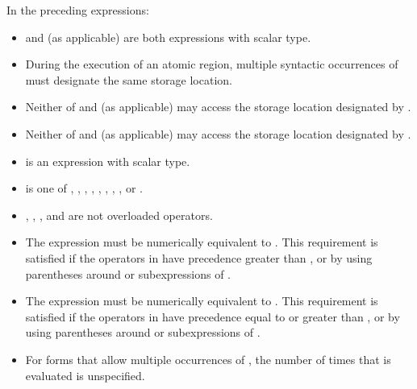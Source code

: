 \begin{ccppspecific}
In the preceding expressions:

\begin{itemize}
\item {} and  (as applicable) are both  expressions with scalar type.

\item During the execution of an atomic region, multiple syntactic occurrences of  must 
designate the same storage location.

\item Neither of  and  (as applicable) may access the storage location designated by .

\item Neither of  and  (as applicable) may access the storage location designated by .

\item {} is an expression with scalar type. 

\item {} is one of \code{+}, \code{*}, \code{-}, \code{/}, 
\code{\&}, \code{\^}, \code{|}, \code{\textless \hspace{0.05em}\textless}, or 
\code{\textgreater \hspace{0.05em}\textgreater}.

\item {}, \code{=}, \code{++}, and \code{\--\--} are not overloaded operators.

\item The expression    must be numerically equivalent to 
  . This 
requirement is satisfied if the operators in  have precedence greater than , 
or by using parentheses around  or subexpressions of .

\item The expression    must be numerically equivalent to 
  . This 
requirement is satisfied if the operators in  have precedence equal to or greater 
than , or by using parentheses around  or subexpressions of .

\item For forms that allow multiple occurrences of , the number of times that  is 
evaluated is unspecified.
\end{itemize}
\end{ccppspecific}

